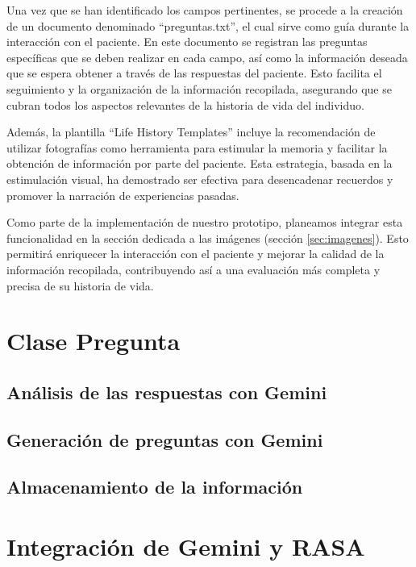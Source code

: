 Una vez que se han identificado los campos pertinentes, se procede a la creación de un documento denominado ``preguntas.txt'', el cual sirve como guía durante la interacción con el paciente. En este documento se registran las preguntas específicas que se deben realizar en cada campo, así como la información deseada que se espera obtener a través de las respuestas del paciente. Esto facilita el seguimiento y la organización de la información recopilada, asegurando que se cubran todos los aspectos relevantes de la historia de vida del individuo.

Además, la plantilla ``Life History Templates'' incluye la recomendación de utilizar fotografías como herramienta para estimular la memoria y facilitar la obtención de información por parte del paciente. Esta estrategia, basada en la estimulación visual, ha demostrado ser efectiva para desencadenar recuerdos y promover la narración de experiencias pasadas.

Como parte de la implementación de nuestro prototipo, planeamos integrar esta funcionalidad en la sección dedicada a las imágenes (sección \ref{sec:imagenes}). Esto permitirá enriquecer la interacción con el paciente y mejorar la calidad de la información recopilada, contribuyendo así a una evaluación más completa y precisa de su historia de vida. 

\section{Clase Pregunta}
\subsection{Análisis de las respuestas con Gemini}

\subsection{Generación de preguntas con Gemini}
\subsection{Almacenamiento de la información}
\section{Integración de Gemini y RASA}

